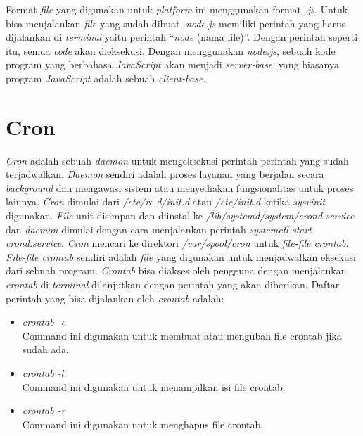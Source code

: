 Format \textit{file} yang digunakan untuk \textit{platform} ini menggunakan format \textit{.js}. Untuk bisa menjalankan \textit{file} yang sudah dibuat, \textit{node.js} memiliki perintah yang harus dijalankan di \textit{terminal} yaitu perintah ``\textit{node} (nama file)''. Dengan perintah seperti itu, semua \textit{code} akan dieksekusi. Dengan menggunakan \textit{node.js}, sebuah kode program yang berbahasa \textit{JavaScript} akan menjadi \textit{server-base}, yang biasanya program \textit{JavaScript} adalah sebuah \textit{client-base}. 

\section{Cron}
\label{sec:cron}
\textit{Cron} adalah sebuah \textit{daemon} untuk mengeksekusi perintah-perintah yang sudah terjadwalkan. \textit{Daemon} sendiri adalah proses layanan yang berjalan secara \textit{background} dan mengawasi sistem atau menyediakan fungsionalitas untuk proses lainnya. \textit{Cron} dimulai dari \textit{/etc/rc.d/init.d} atau \textit{/etc/init.d} ketika \textit{sysvinit} digunakan. \textit{File} unit disimpan dan diinstal ke \textit{/lib/systemd/system/crond.service} dan \textit{daemon} dimulai dengan cara menjalankan perintah \textit{systemctl start crond.service}. \textit{Cron} mencari ke direktori \textit{/var/spool/cron} untuk \textit{file-file crontab}. \textit{File-file crontab} sendiri adalah \textit{file} yang digunakan untuk menjadwalkan eksekusi dari sebuah program. \textit{Crontab} bisa diakses oleh pengguna dengan menjalankan \textit{crontab} di \textit{terminal} dilanjutkan dengan perintah yang akan diberikan. Daftar perintah yang bisa dijalankan oleh \textit{crontab} adalah:
\begin{itemize}
	\item \textit{crontab -e}\\
	Command ini digunakan untuk membuat atau mengubah file crontab jika sudah ada. 
	\item \textit{crontab -l}\\
	Command ini digunakan untuk menampilkan isi file crontab.
	\item \textit{crontab -r}\\
	Command ini digunakan untuk menghapus file crontab.
\end{itemize}

